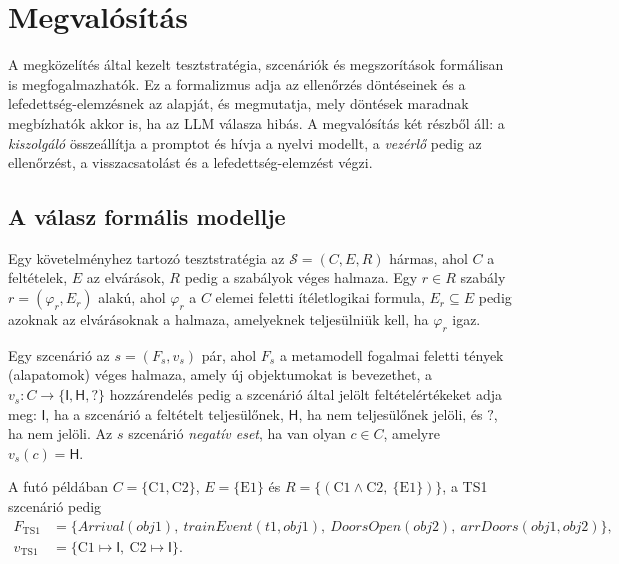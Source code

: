 \chapter{Megvalósítás}
\label{chap:implementation}

A megközelítés által kezelt tesztstratégia, szcenáriók és megszorítások formálisan is megfogalmazhatók. Ez a formalizmus adja az ellenőrzés döntéseinek és a lefedettség-elemzésnek az alapját, és megmutatja, mely döntések maradnak megbízhatók akkor is, ha az LLM válasza hibás. A megvalósítás két részből áll: a \emph{kiszolgáló} összeállítja a promptot és hívja a nyelvi modellt, a \emph{vezérlő} pedig az ellenőrzést, a visszacsatolást és a lefedettség-elemzést végzi.


\section{A válasz formális modellje}
\label{sec:impl-model}

\begin{definition}[Tesztstratégia]
Egy követelményhez tartozó tesztstratégia az $\mathcal{S} = (C, E, R)$ hármas, ahol $C$ a feltételek, $E$ az elvárások, $R$ pedig a szabályok véges halmaza. Egy $r \in R$ szabály $r = (\varphi_r, E_r)$ alakú, ahol $\varphi_r$ a $C$ elemei feletti ítéletlogikai formula, $E_r \subseteq E$ pedig azoknak az elvárásoknak a halmaza, amelyeknek teljesülniük kell, ha $\varphi_r$ igaz.
\end{definition}

\begin{definition}[Szcenárió]
Egy szcenárió az $s = (F_s, v_s)$ pár, ahol $F_s$ a metamodell fogalmai feletti tények (alapatomok) véges halmaza, amely új objektumokat is bevezethet, a $v_s \colon C \to \{\mathsf{I}, \mathsf{H}, \mathsf{?}\}$ hozzárendelés pedig a szcenárió által jelölt feltételértékeket adja meg: $\mathsf{I}$, ha a szcenárió a feltételt teljesülőnek, $\mathsf{H}$, ha nem teljesülőnek jelöli, és $\mathsf{?}$, ha nem jelöli. Az $s$ szcenárió \emph{negatív eset}, ha van olyan $c \in C$, amelyre $v_s(c) = \mathsf{H}$.
\end{definition}

A futó példában $C = \{\mathrm{C1}, \mathrm{C2}\}$, $E = \{\mathrm{E1}\}$ és $R = \{(\mathrm{C1} \land \mathrm{C2},\ \{\mathrm{E1}\})\}$, a TS1 szcenárió pedig
\begin{align*}
F_{\mathrm{TS1}} &= \{\mathit{Arrival}(\mathit{obj1}),\ \mathit{trainEvent}(\mathit{t1}, \mathit{obj1}),\ \mathit{DoorsOpen}(\mathit{obj2}),\ \mathit{arrDoors}(\mathit{obj1}, \mathit{obj2})\},\\
v_{\mathrm{TS1}} &= \{\mathrm{C1} \mapsto \mathsf{I},\ \mathrm{C2} \mapsto \mathsf{I}\}.
\end{align*}

